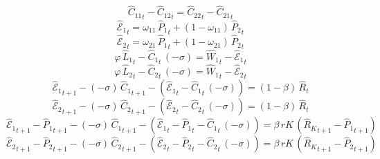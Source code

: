 \begin{dmath}
{{\hat{C}_{1 1}}}_{t}-{{\hat{C}_{1 2}}}_{t}={{\hat{C}_{2 2}}}_{t}-{{\hat{C}_{2 1}}}_{t}
\end{dmath}
\begin{dmath}
{{\hat{\mathscr{E}}_{1}}}_{t}={{\omega_{11}}}\, {{\hat{P}_{1}}}_{t}+\left(1-{{\omega_{11}}}\right)\, {{\hat{P}_{2}}}_{t}
\end{dmath}
\begin{dmath}
{{\hat{\mathscr{E}}_{2}}}_{t}={{\omega_{21}}}\, {{\hat{P}_{1}}}_{t}+\left(1-{{\omega_{21}}}\right)\, {{\hat{P}_{2}}}_{t}
\end{dmath}
\begin{dmath}
{{\varphi}}\, {{\hat{L}_{1}}}_{t}-{{\hat{C}_{1}}}_{t}\, \left(-{{\sigma}}\right)={{\hat{W}_{1}}}_{t}-{{\hat{\mathscr{E}}_{1}}}_{t}
\end{dmath}
\begin{dmath}
{{\varphi}}\, {{\hat{L}_{2}}}_{t}-{{\hat{C}_{2}}}_{t}\, \left(-{{\sigma}}\right)={{\hat{W}_{1}}}_{t}-{{\hat{\mathscr{E}}_{2}}}_{t}
\end{dmath}
\begin{dmath}
{{\hat{\mathscr{E}}_{1}}}_{t+1}-\left(-{{\sigma}}\right)\, {{\hat{C}_{1}}}_{t+1}-\left({{\hat{\mathscr{E}}_{1}}}_{t}-{{\hat{C}_{1}}}_{t}\, \left(-{{\sigma}}\right)\right)=\left(1-{{\beta}}\right)\, {{\hat{R}}}_{t}
\end{dmath}
\begin{dmath}
{{\hat{\mathscr{E}}_{2}}}_{t+1}-\left(-{{\sigma}}\right)\, {{\hat{C}_{2}}}_{t+1}-\left({{\hat{\mathscr{E}}_{2}}}_{t}-{{\hat{C}_{2}}}_{t}\, \left(-{{\sigma}}\right)\right)=\left(1-{{\beta}}\right)\, {{\hat{R}}}_{t}
\end{dmath}
\begin{dmath}
{{\hat{\mathscr{E}}_{1}}}_{t+1}-{{\hat{P}_{1}}}_{t+1}-\left(-{{\sigma}}\right)\, {{\hat{C}_{1}}}_{t+1}-\left({{\hat{\mathscr{E}}_{1}}}_{t}-{{\hat{P}_{1}}}_{t}-{{\hat{C}_{1}}}_{t}\, \left(-{{\sigma}}\right)\right)={{\beta}}\, {rK}\, \left({{\hat{R}_{K}}}_{t+1}-{{\hat{P}_{1}}}_{t+1}\right)
\end{dmath}
\begin{dmath}
{{\hat{\mathscr{E}}_{2}}}_{t+1}-{{\hat{P}_{2}}}_{t+1}-\left(-{{\sigma}}\right)\, {{\hat{C}_{2}}}_{t+1}-\left({{\hat{\mathscr{E}}_{2}}}_{t}-{{\hat{P}_{2}}}_{t}-{{\hat{C}_{2}}}_{t}\, \left(-{{\sigma}}\right)\right)={{\beta}}\, {rK}\, \left({{\hat{R}_{K}}}_{t+1}-{{\hat{P}_{2}}}_{t+1}\right)
\end{dmath}
